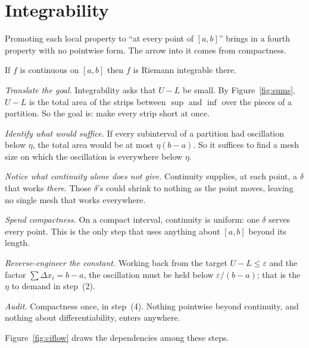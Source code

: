 \section{Integrability}
\label{sec:int}

Promoting each local property to ``at every point of $[a,b]$'' brings in a
fourth property with no pointwise form. The arrow into it comes from
compactness.

\begin{theorem}\label{thm:ci}
If $f$ is continuous on $[a,b]$ then $f$ is Riemann integrable there.
\end{theorem}

\begin{flow}
  \item \textit{Translate the goal.} Integrability asks that $U-L$ be small.
        By Figure~\ref{fig:sums}, $U-L$ is the total area of the strips
        between $\sup$ and $\inf$ over the pieces of a partition. So the goal
        is: make every strip short at once.
  \item \textit{Identify what would suffice.} If every subinterval of a
        partition had oscillation below $\eta$, the total area would be at
        most $\eta(b-a)$. So it suffices to find a mesh size on which the
        oscillation is everywhere below $\eta$.
  \item \textit{Notice what continuity alone does not give.} Continuity
        supplies, at each point, a $\delta$ that works \emph{there}. Those
        $\delta$'s could shrink to nothing as the point moves, leaving no
        single mesh that works everywhere.
  \item \textit{Spend compactness.} On a compact interval, continuity is
        uniform: one $\delta$ serves every point. This is the only step that
        uses anything about $[a,b]$ beyond its length.
  \item \textit{Reverse-engineer the constant.} Working back from the target
        $U-L \le \varepsilon$ and the factor $\sum \Delta x_i = b-a$, the
        oscillation must be held below $\varepsilon/(b-a)$; that is the
        $\eta$ to demand in step~(2).
  \item \textit{Audit.} Compactness once, in step~(4). Nothing pointwise
        beyond continuity, and nothing about differentiability, enters
        anywhere.
\end{flow}

Figure~\ref{fig:ciflow} draws the dependencies among these steps.

